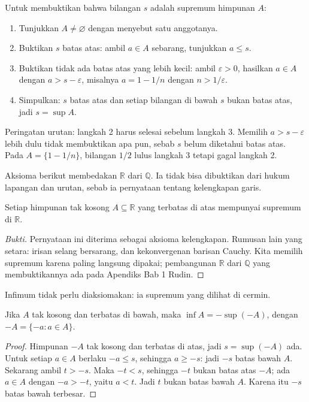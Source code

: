 \begin{resep}
Untuk membuktikan bahwa bilangan $s$ adalah supremum himpunan $A$:
\begin{enumerate}
\item Tunjukkan $A\neq\varnothing$ dengan menyebut satu anggotanya.
\item Buktikan $s$ batas atas: ambil $a\in A$ sebarang, tunjukkan $a\le s$.
\item Buktikan tidak ada batas atas yang lebih kecil: ambil $\varepsilon>0$, hasilkan
      $a\in A$ dengan $a>s-\varepsilon$, misalnya $a=1-1/n$ dengan $n>1/\varepsilon$.
\item Simpulkan: $s$ batas atas dan setiap bilangan di bawah $s$ bukan batas atas, jadi
      $s=\sup A$.
\end{enumerate}
Peringatan urutan: langkah 2 harus selesai sebelum langkah 3. Memilih $a>s-\varepsilon$
lebih dulu tidak membuktikan apa pun, sebab $s$ belum diketahui batas atas. Pada
$A=\{1-1/n\}$, bilangan $1/2$ lulus langkah 3 tetapi gagal langkah 2.
\end{resep}

Aksioma berikut membedakan $\mathbb{R}$ dari $\mathbb{Q}$. Ia tidak bisa dibuktikan dari
hukum lapangan dan urutan, sebab ia pernyataan tentang kelengkapan garis.

\begin{teorema}
Setiap himpunan tak kosong $A\subseteq\mathbb{R}$ yang terbatas di atas mempunyai
supremum di $\mathbb{R}$.
\end{teorema}

\begin{proof}[Bukti]
Pernyataan ini diterima sebagai aksioma kelengkapan. Rumusan lain yang setara: irisan
selang bersarang, dan kekonvergenan barisan Cauchy. Kita memilih supremum karena paling
langsung dipakai; pembangunan $\mathbb{R}$ dari $\mathbb{Q}$ yang membuktikannya ada
pada Apendiks Bab 1 Rudin.
\end{proof}

Infimum tidak perlu diaksiomakan: ia supremum yang dilihat di cermin.

\begin{proposisi}
Jika $A$ tak kosong dan terbatas di bawah, maka $\inf A=-\sup(-A)$, dengan
$-A=\{-a: a\in A\}$.
\end{proposisi}

\begin{proof}
Himpunan $-A$ tak kosong dan terbatas di atas, jadi $s=\sup(-A)$ ada. Untuk setiap
$a\in A$ berlaku $-a\le s$, sehingga $a\ge -s$: jadi $-s$ batas bawah $A$. Sekarang
ambil $t>-s$. Maka $-t<s$, sehingga $-t$ bukan batas atas $-A$; ada $a\in A$ dengan
$-a>-t$, yaitu $a<t$. Jadi $t$ bukan batas bawah $A$. Karena itu $-s$ batas bawah
terbesar.
\end{proof}

